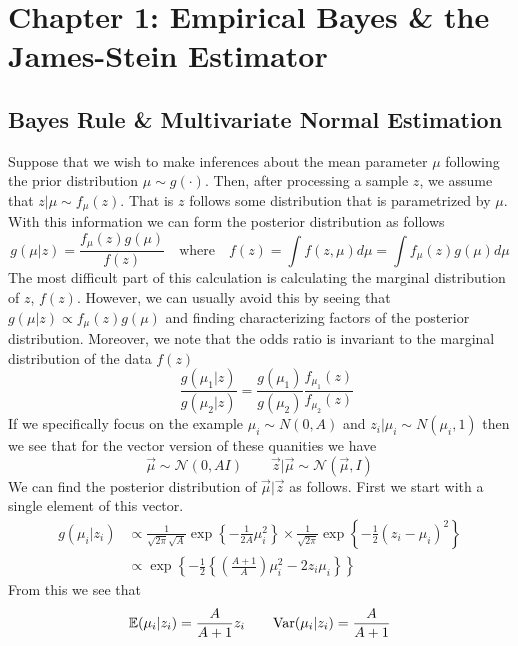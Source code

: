 \documentclass[11pt]{article}
\begin{document}
\section{Chapter 1: Empirical Bayes \& the James-Stein Estimator}

\subsection{Bayes Rule \& Multivariate Normal Estimation}

Suppose that we wish to make inferences about the mean parameter $\mu$ following the prior distribution $\mu\sim g(\cdot)$. Then, after processing a sample $z$, we assume that $z|\mu \sim f_{\mu}(z)$. That is $z$ follows some distribution that is parametrized by $\mu$. With this information we can form the posterior distribution as follows
\begin{equation}
	g(\mu|z) = \frac{f_{\mu}(z)g(\mu)}{f(z)}\quad\text{where}\quad f(z) = \int f(z,\mu)d\mu = \int f_{\mu}(z)g(\mu)d\mu
\end{equation}
The most difficult part of this calculation is calculating the marginal distribution of $z$, $f(z)$. However, we can usually avoid this by seeing that $g(\mu|z) \propto f_{\mu}(z)g(\mu)$ and finding characterizing factors of the posterior distribution. Moreover, we note that the odds ratio is invariant to the marginal distribution of the data $f(z)$ 
\begin{equation}
	\quad \frac{g(\mu_1|z)}{g(\mu_2|z)} = \frac{g(\mu_1)}{g(\mu_2)}\frac{f_{\mu_1}(z)}{f_{\mu_2}(z)}
\end{equation}
If we specifically focus on the example $\mu_i\sim N(0,A)$ and $z_i|\mu_i\sim N(\mu_i,1)$ then we see that for the vector version of these quanities we have 
\begin{equation}
	\vec{\mu} \sim\mathcal{N}(0, AI)\quad\quad \vec{z}|\vec{\mu}\sim\mathcal{N}(\vec{\mu}, I)
\end{equation}
We can find the posterior distribution of $\vec{\mu}|\vec{z}$ as follows. First we start with a single element of this vector. 
\begin{align*}
g(\mu_i|z_i) &\propto \frac{1}{\sqrt{2\pi}\sqrt{A}} \exp\left\{-\frac{1}{2A}\mu_i^2\right\}\times\frac{1}{\sqrt{2\pi}}\exp\left\{-\frac{1}{2}(z_i-\mu_i)^2\right\}\\
&\propto \exp\left\{-\frac{1}{2}\left\{\left(\frac{A+1}{A}\right)\mu_i^2 - 2z_i\mu_i\right\}\right\}
\end{align*}
From this we see that
\begin{equation}
	{\mathbb{E}}(\mu_i|z_i) = \frac{A}{A+1}z_i\quad\quad{\text{Var}}(\mu_i|z_i) = \frac{A}{A+1}
\end{equation}
\end{document}
